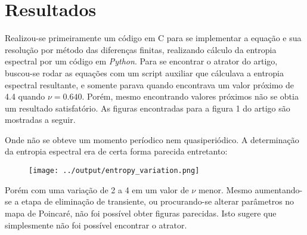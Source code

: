 \documentclass{article}[twocolumn]
\begin{document}
	\section{Resultados}
	Realizou-se primeiramente um c\'odigo em C para se implementar a equa\c{c}\~ao e sua resolu\c{c}\~ao por m\'etodo das diferen\c{c}as finitas,
	realizando c\'alculo da entropia espectral por um c\'odigo em \textit{Python}. Para se encontrar o atrator do artigo, buscou-se rodar as equa\c{c}\~oes
	com um script auxiliar que c\'alculava a entropia espectral resultante, e somente parava quando encontrava um valor pr\'oximo de 4.4 quando $\nu = 0.640$.
	Por\'em, mesmo encontrando valores pr\'oximos n\~ao se obtia um resultado satisfat\'orio. As figuras encontradas para a figura 1 do artigo s\~ao mostradas
	a seguir.
	\begin{figure}[H]
		\centering
	\end{figure}
	Onde n\~ao se obteve um momento per\'iodico nem quasiperi\'odico. A determina\c{c}\~ao da entropia espectral era de certa forma parecida entretanto:
	\begin{figure}[H]
		\centering
		\texttt{[image: ../output/entropy\_variation.png]}
	\end{figure}
	Por\'em com uma varia\c{c}\~ao de 2 a 4 em um valor de $\nu$ menor. Mesmo aumentando-se a etapa de elimina\c{c}\~ao de transiente, ou
	procurando-se alterar par\^ametros no mapa de Poincar\'e, n\~ao foi poss\'ivel obter figuras parecidas. Isto sugere que simplesmente
	n\~ao foi poss\'ivel encontrar o atrator.
\end{document}
